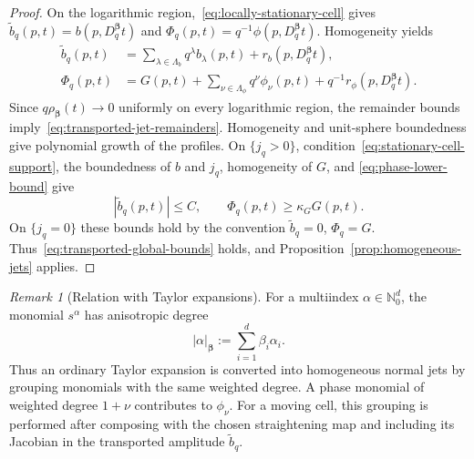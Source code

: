 \documentclass[11pt]{amsart}
\numberwithin{equation}{section}
\theoremstyle{definition}
\theoremstyle{remark}
\newtheorem{remark}[theorem]{Remark}
\begin{document}
\begin{proof}
On the logarithmic region,~\eqref{eq:locally-stationary-cell} gives
$\widetilde b_q(p,t)=b(p,D_q^{\bm\beta}t)$ and
$\Phi_q(p,t)=q^{-1}\phi(p,D_q^{\bm\beta}t)$.  Homogeneity yields
\begin{align*}
 \widetilde b_q(p,t)&=\sum_{\lambda\in\Lambda_b}q^\lambda b_\lambda(p,t)
 +r_b(p,D_q^{\bm\beta}t),\\
 \Phi_q(p,t)&=G(p,t)+\sum_{\nu\in\Lambda_\phi}q^\nu\phi_\nu(p,t)
 +q^{-1}r_\phi(p,D_q^{\bm\beta}t).
\end{align*}
Since $q\rho_{\bm\beta}(t)\to0$ uniformly on every logarithmic region, the
remainder bounds imply~\eqref{eq:transported-jet-remainders}.  Homogeneity and
unit-sphere boundedness give polynomial growth of the profiles.  On
$\{j_q>0\}$, condition~\eqref{eq:stationary-cell-support}, the boundedness of $b$ and $j_q$, homogeneity of $G$, and
\eqref{eq:phase-lower-bound} give
\[
 |\widetilde b_q(p,t)|\le C,
 \qquad
 \Phi_q(p,t)\ge\kappa_G G(p,t).
\]
On $\{j_q=0\}$ these bounds hold by the convention $\widetilde b_q=0$, $\Phi_q=G$.
Thus~\eqref{eq:transported-global-bounds} holds, and
Proposition~\ref{prop:homogeneous-jets} applies.
\end{proof}

\begin{remark}[Relation with Taylor expansions]\label{rem:Taylor}
For a multiindex $\alpha\in\mathbb{N}_0^d$, the monomial $s^\alpha$ has
anisotropic degree
\begin{equation}\label{eq:weighted-degree}
 |\alpha|_{\bm\beta}:=\sum_{i=1}^d\beta_i\alpha_i.
\end{equation}
Thus an ordinary Taylor expansion is converted into homogeneous normal jets by
grouping monomials with the same weighted degree.  A phase monomial of weighted
degree $1+\nu$ contributes to $\phi_\nu$.  For a moving cell, this grouping is
performed after composing with the chosen straightening map and including its
Jacobian in the transported amplitude $\widetilde b_q$.
\end{remark}
\end{document}
